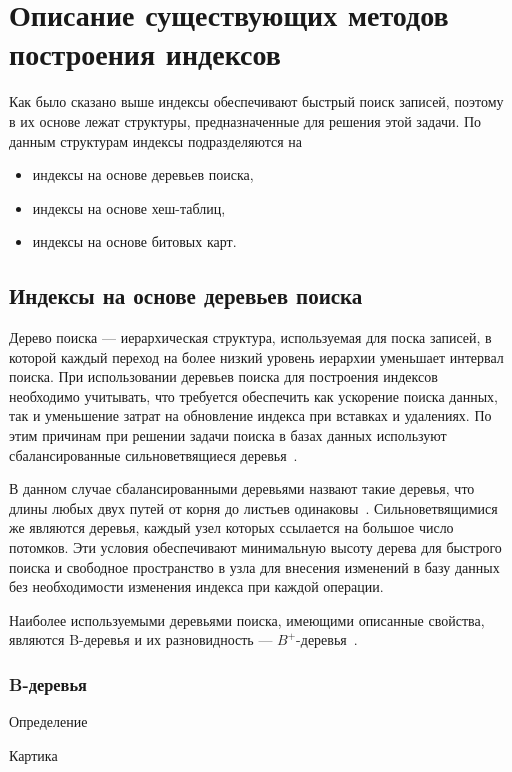 \chapter{Описание существующих методов построения индексов\label{methods}}

Как было сказано выше индексы обеспечивают быстрый поиск записей, поэтому в их
основе лежат структуры, предназначенные для решения этой задачи. По данным
структурам индексы подразделяются на
\begin{itemize}
    \item индексы на основе деревьев поиска,
    \item индексы на основе хеш-таблиц,
    \item индексы на основе битовых карт.
\end{itemize}

\section{Индексы на основе деревьев поиска}

Дерево поиска --- иерархическая структура, используемая для поска записей, в
которой каждый переход на более низкий уровень иерархии уменьшает интервал
поиска. При использовании деревьев поиска для построения
индексов необходимо учитывать, что требуется обеспечить как ускорение поиска
данных, так и уменьшение затрат на обновление индекса при вставках и
удалениях. По этим причинам при решении задачи поиска в базах данных
используют сбалансированные сильноветвящиеся деревья~\cite{arki}.

В данном случае сбалансированными деревьями назвают такие деревья, что длины
любых двух путей от корня до листьев одинаковы~\cite{general}. Сильноветвящимися
же являются деревья, каждый узел которых ссылается на большое число потомков.
Эти условия обеспечивают минимальную высоту дерева для быстрого поиска и 
свободное пространство в узла для внесения изменений в базу данных без
необходимости изменения индекса при каждой операции.

Наиболее используемыми деревьями поиска, имеющими описанные свойства, являются
B-деревья и их разновидность --- $B^+$-деревья~\cite{arki}.

\subsection{B-деревья}

Определение

Картика

